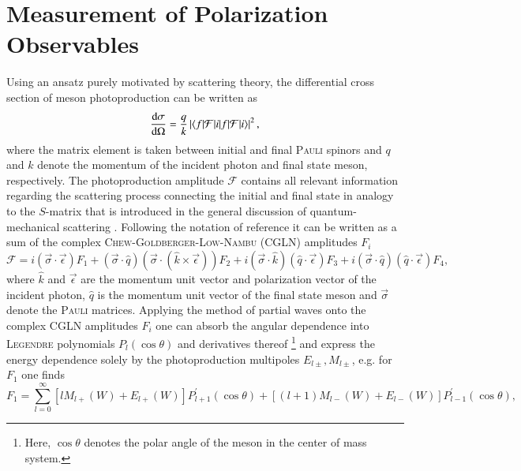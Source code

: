 \section{Measurement of Polarization Observables}
Using an ansatz purely motivated by scattering theory, the differential cross section of meson photoproduction can be written as 
\begin{equation}
	\frac{\text{d}\sigma}{\text{d}\Omega}=\frac{q}{k}\left|\braket{f|\mathcal{F}|i}\right|^2,
	\label{eq:cs}
\end{equation}
where the matrix element is taken between initial and final \textsc{Pauli} spinors \cite{cgln} and $q$ and $k$ denote the momentum of the incident photon and final state meson, respectively. The photoproduction amplitude $\mathcal{F}$ contains all relevant information regarding the scattering process connecting the initial and final state in analogy to the $S$-matrix that is introduced in the general discussion of quantum-mechanical scattering \cite{ps}. Following the notation of reference \cite{cgln} it can be written as a sum of the complex \textsc{Chew-Goldberger-Low-Nambu} (CGLN) amplitudes $F_i$
\begin{equation}
	\mathcal{F}=i(\vec{\sigma} \cdot \vec{\epsilon}) F_{1}+(\vec{\sigma} \cdot \hat{q})(\vec{\sigma} \cdot(\hat{k} \times \vec{\epsilon})) F_{2}+i(\vec{\sigma} \cdot \hat{k})(\hat{q} \cdot \vec{\epsilon}) F_{3}+i(\vec{\sigma} \cdot \hat{q})(\hat{q} \cdot \vec{\epsilon}) F_{4},
\end{equation}
where $\hat{k}$ and $\vec{\epsilon}$ are the momentum unit vector and polarization vector of the incident photon, $\hat{q}$ is the momentum unit vector of the final state meson and $\vec{\sigma}$ denote the \textsc{Pauli} matrices. Applying the method of partial waves onto the complex CGLN amplitudes $F_i$ one can absorb the angular dependence into \textsc{Legendre} polynomials $P_l(\cos\theta)$ and derivatives thereof \footnote{Here, $\cos\theta$ denotes the polar angle of the meson in the center of mass system.} and express the energy dependence solely by the photoproduction multipoles $E_{l\pm},M_{l\pm}$, e.g. for $F_1$ one finds\cite{cgln}
\begin{equation}
	F_{1}=\sum_{l=0}^{\infty}\left[l M_{l+}(W)+E_{l+}(W)\right] P_{l+1}^{\prime}(\cos \theta)+\left[(l+1) M_{l-}(W)+E_{l-}(W)\right] P_{l-1}^{\prime}(\cos \theta),
	\label{eq:f1}
\end{equation}
